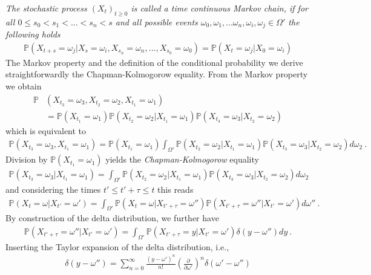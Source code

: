 \documentclass[11pt,a4paper]{article}
\numberwithin{equation}{section}
\begin{document}
\textit{
The stochastic process $(X_t)_{t\geq 0 }$ is called a time continuous Markov chain, if for all $0\leq s_0<s_1<...<s_n<s$ and all possible events $\omega_0,\omega_1,...\omega_n,\omega_i,\omega_j\in\Omega'$ the following holds
\begin{align*}
\mathbb{P}(X_{t+s}=\omega_j|X_{s}=\omega_i,X_{s_n}=\omega_n,..., X_{s_0}=\omega_0)
=
\mathbb{P}(X_{t}=\omega_j|X_{0}=\omega_i)
\end{align*}
} 
The Markov property and the definition of the conditional probability we derive straightforwardly the Chapman-Kolmogorow equality. 
%
From the Markov property we obtain
\begin{align*}
\mathbb{P}&(X_{t_3}=\omega_{3},X_{t_2}=\omega_{2},X_{t_1}=\omega_{1})\\
&=
\mathbb{P}(X_{t_1}=\omega_{1})\mathbb{P}(X_{t_2}=\omega_{2}|X_{t_1}=\omega_{1})\mathbb{P}(X_{t_3}=\omega_{3}|X_{t_2}=\omega_{2})
\end{align*}
which is equivalent to
\begin{align*}
\mathbb{P}(X_{t_3}=\omega_{3},X_{t_1}=\omega_{1})
=
\mathbb{P}(X_{t_1}=\omega_{1})\int_{\Omega'}\mathbb{P}(X_{t_2}=\omega_{2}|X_{t_1}=\omega_{1})\mathbb{P}(X_{t_3}=\omega_{3}|X_{t_2}=\omega_{2})d\omega_{2}~.
\end{align*}
Division by $\mathbb{P}(X_{t_1}=\omega_{1})$ yields the {\it Chapman-Kolmogorow} equality
\begin{align*}
\label{eq:Chapman-Kolmogorow}
\mathbb{P}(X_{t_3}=\omega_{3}|X_{t_1}=\omega_{1})
=\int_{\Omega'}\mathbb{P}(X_{t_2}=\omega_{2}|X_{t_1}=\omega_{1})\mathbb{P}(X_{t_3}=\omega_{3}|X_{t_2}=\omega_{2})d\omega_{2}
\end{align*}
and considering the times $t'\leq t'+\tau\leq t$ this reads
\begin{align}
\label{eq:Chapman-KolmogorowApl}
\mathbb{P}(X_{t}=\omega|X_{t'}=\omega')
=\int_{\Omega'}\mathbb{P}(X_{t}=\omega|X_{t'+\tau}=\omega'')\mathbb{P}(X_{t'+\tau}=\omega''|X_{t'}=\omega' )d\omega''~.
\end{align}
By construction of the delta distribution, we further have
\begin{align}
\label{eq:Integrant1}
\mathbb{P}(X_{t'+\tau}=\omega''|X_{t'}=\omega')
=
\int_{\Omega'}\mathbb{P}(X_{t'+\tau}=y|X_{t'}=\omega')\delta(y-\omega'')dy~.
\end{align}
Inserting the Taylor expansion of the delta distribution, i.e.,
\begin{align*}
\delta(y-\omega'') = \sum_{n=0}^{\infty}\frac{(y-\omega')^n}{n!}\left( \frac{\partial}{\partial \omega'} \right)^n\delta(\omega'-\omega'')
\end{align*}
\end{document}
